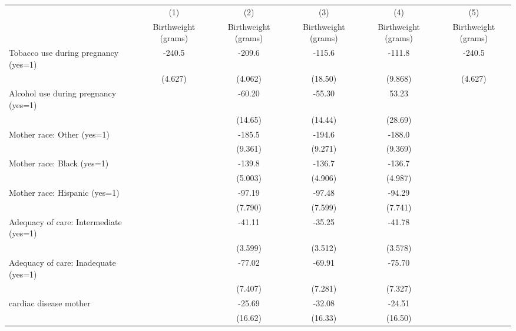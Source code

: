 \begin{tabular}{l*{5}{c}}
\hline\hline
                    &\multicolumn{1}{c}{(1)}&\multicolumn{1}{c}{(2)}&\multicolumn{1}{c}{(3)}&\multicolumn{1}{c}{(4)}&\multicolumn{1}{c}{(5)}\\
                    &\multicolumn{1}{c}{Birthweight (grams)}&\multicolumn{1}{c}{Birthweight (grams)}&\multicolumn{1}{c}{Birthweight (grams)}&\multicolumn{1}{c}{Birthweight (grams)}&\multicolumn{1}{c}{Birthweight (grams)}\\
\hline
Tobacco use during pregnancy (yes=1)&      -240.5&      -209.6&      -115.6&      -111.8&      -240.5\\
                    &     (4.627)&     (4.062)&     (18.50)&     (9.868)&     (4.627)\\
[1em]
Alcohol use during pregnancy (yes=1)&            &      -60.20&      -55.30&       53.23&            \\
                    &            &     (14.65)&     (14.44)&     (28.69)&            \\
[1em]
Mother race: Other (yes=1)&            &      -185.5&      -194.6&      -188.0&            \\
                    &            &     (9.361)&     (9.271)&     (9.369)&            \\
[1em]
Mother race: Black (yes=1)&            &      -139.8&      -136.7&      -136.7&            \\
                    &            &     (5.003)&     (4.906)&     (4.987)&            \\
[1em]
Mother race: Hispanic (yes=1)&            &      -97.19&      -97.48&      -94.29&            \\
                    &            &     (7.790)&     (7.599)&     (7.741)&            \\
[1em]
Adequacy of care: Intermediate (yes=1)&            &      -41.11&      -35.25&      -41.78&            \\
                    &            &     (3.599)&     (3.512)&     (3.578)&            \\
[1em]
Adequacy of care: Inadequate (yes=1)&            &      -77.02&      -69.91&      -75.70&            \\
                    &            &     (7.407)&     (7.281)&     (7.327)&            \\
[1em]
cardiac disease mother&            &      -25.69&      -32.08&      -24.51&            \\
                    &            &     (16.62)&     (16.33)&     (16.50)&            \\

\end{tabular}
